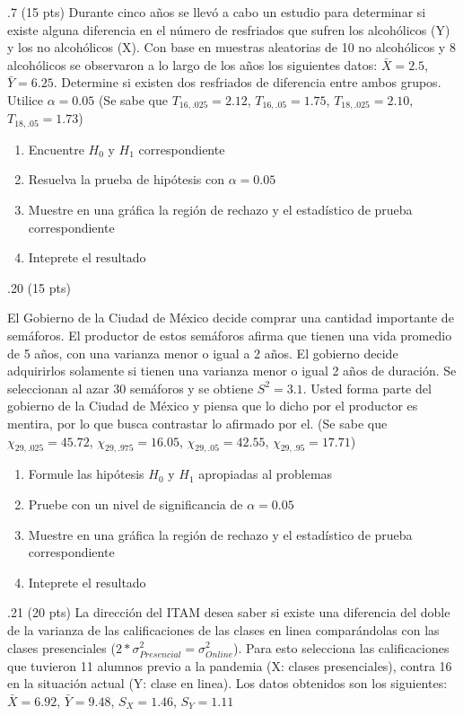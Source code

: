 \documentclass[addpoints]{exam}
\theoremstyle{mytheor}
\begin{document}
  
\begin{questions} 
 
.7 (15 pts) Durante cinco años se llevó a cabo un estudio para determinar si existe alguna diferencia en el número de resfriados que sufren los alcohólicos (Y) y los no alcohólicos (X). Con base en muestras aleatorias de 10 no alcohólicos y 8 alcohólicos se observaron a lo largo de los años los siguientes datos: $\bar{X} = 2.5$, $\bar{Y} = 6.25$. Determine si existen dos resfriados de diferencia entre ambos grupos. Utilice $\alpha = 0.05$ (Se sabe que $T_{16,.025} = 2.12$, $T_{16,.05} = 1.75$, $T_{18,.025} = 2.10$, $T_{18,.05} = 1.73$)

\begin{enumerate}
\item Encuentre $H_0$ y $H_1$ correspondiente
\item Resuelva la prueba de hipótesis con $\alpha=0.05$
\item Muestre en una gráfica la región de rechazo y el estadístico de prueba correspondiente
\item Inteprete el resultado
\end{enumerate}
 
 
 .20 (15 pts)

El Gobierno de la Ciudad de México decide comprar una cantidad importante de semáforos. El productor de estos semáforos afirma que tienen una vida promedio de 5 años, con una varianza menor o igual a 2 años. El gobierno decide adquirirlos solamente si tienen una varianza menor o igual 2 años de duración. Se seleccionan al azar 30 semáforos y se obtiene $S^2 = 3.1$. Usted forma parte del gobierno de la Ciudad de México y piensa que lo dicho por el productor es mentira, por lo que busca contrastar lo afirmado por el. (Se sabe que $\chi_{29,.025} = 45.72$, $\chi_{29,.975} = 16.05$, $\chi_{29,.05} = 42.55$, $\chi_{29,.95} = 17.71$)

\begin{enumerate}
\item Formule las hipótesis $H_0$ y $H_1$ apropiadas al problemas
\item Pruebe con un nivel de significancia de $\alpha = 0.05$
\item Muestre en una gráfica la región de rechazo y el estadístico de prueba correspondiente
\item Inteprete el resultado
\end{enumerate}

.21 (20 pts)
La dirección del ITAM desea saber si existe una diferencia del doble de la varianza de las calificaciones de las clases en linea comparándolas con las clases presenciales ($2*\sigma^2_{Presencial} = \sigma^2_{Online}$). Para esto selecciona las calificaciones que tuvieron 11 alumnos previo a la pandemia (X: clases presenciales), contra 16 en la situación actual (Y: clase en linea). Los datos obtenidos son los siguientes: $\bar{X} = 6.92$, $\bar{Y} = 9.48$, $S_{X} = 1.46$, $S_{Y} = 1.11$


\end{questions}
\end{document}
